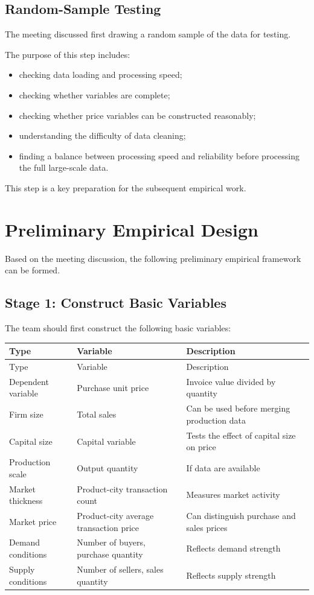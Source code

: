 \documentclass[11pt,a4paper]{article}
\begin{document}
\subsection{Random-Sample Testing}

The meeting discussed first drawing a random sample of the data for testing.

The purpose of this step includes:

\begin{itemize}
    \item checking data loading and processing speed;
    \item checking whether variables are complete;
    \item checking whether price variables can be constructed reasonably;
    \item understanding the difficulty of data cleaning;
    \item finding a balance between processing speed and reliability before processing the full large-scale data.
\end{itemize}

This step is a key preparation for the subsequent empirical work.

\section{Preliminary Empirical Design}

Based on the meeting discussion, the following preliminary empirical framework can be formed.

\subsection{Stage 1: Construct Basic Variables}

The team should first construct the following basic variables:

\begin{longtable}{p{} p{} p{}}
\toprule
Type & Variable & Description \\
\midrule
\endfirsthead
\toprule
Type & Variable & Description \\
\midrule
\endhead
Dependent variable & Purchase unit price & Invoice value divided by quantity \\
Firm size & Total sales & Can be used before merging production data \\
Capital size & Capital variable & Tests the effect of capital size on price \\
Production scale & Output quantity & If data are available \\
Market thickness & Product-city transaction count & Measures market activity \\
Market price & Product-city average transaction price & Can distinguish purchase and sales prices \\
Demand conditions & Number of buyers, purchase quantity & Reflects demand strength \\
Supply conditions & Number of sellers, sales quantity & Reflects supply strength \\
\bottomrule
\end{longtable}
\end{document}
